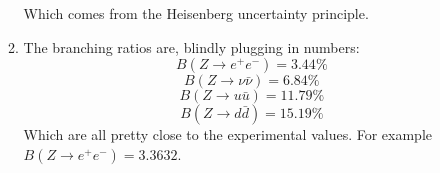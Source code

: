 \documentclass[12pt,a4]{article}
\begin{document}
\begin{enumerate}
\begin{enumerate}
        Which comes from the Heisenberg uncertainty principle.
      \item
        The branching ratios are, blindly plugging in numbers:
        \begin{equation*}
          B(Z \to e^+ e^-) = 3.44 \%
        \end{equation*}
        \begin{equation*}
          B(Z \to \nu \bar{\nu}) = 6.84 \%
        \end{equation*}
        \begin{equation*}
          B(Z \to u \bar{u}) = 11.79 \%
        \end{equation*}
        \begin{equation*}
          B(Z \to d \bar{d}) =  15.19\%
        \end{equation*}
        Which are all pretty close to the experimental values.
        For example $B(Z \to e^+ e^-) = 3.3632$.
    \end{enumerate}
\end{enumerate}
\end{document}
